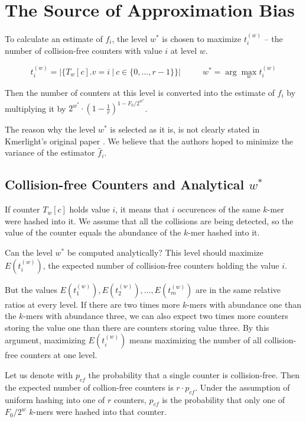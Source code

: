 \section{The Source of Approximation Bias}
\label{sec:source-of-bias}

To calculate an estimate of $f_i$, the level $w^*$ is chosen
to maximize $t_i^{(w)}$ -- the number of collision-free counters with value $i$ at level $w$.

$$t_i^{(w)} = |\{T_w[c].v = i ~|~ c \in \{0, \dots, r-1\}\}| ~~~~~~~~~~~~ w^* = \arg\max_w t_i^{(w)}$$

Then the number of counters at this level is converted into the estimate of $f_i$ by multiplying it by 
$2^{w^*} \cdot \left(1 - \frac{1}{r}\right)^{1 - F_0/2^{w^*}}$. 

The reason why the level $w^*$ is selected as it is, is not clearly stated in Kmerlight's original paper \cite{Sivadasan2016}. 
We believe that the authors hoped to minimize the variance of the estimator $\hat f_i$.

\subsection{Collision-free Counters and Analytical $w^*$}
\label{sec:analytical-w}
If counter $T_w[c]$ holds value $i$, it means that $i$ occurences of the same $k$-mer were hashed into it.
We assume that all the collisions are being detected, so the value of the counter equals the abundance of the $k$-mer hashed into it.

Can the level $w^*$ be computed analytically? This level should maximize $E(t_i^{(w)})$, the expected number of collision-free counters holding the value $i$.

But the values $E(t_1^{(w)}), E(t_2^{(w)}), \dots, E(t_m^{(w)})$ are in the same relative ratios at every level. If there are two times more $k$-mers with
abundance one than the $k$-mers with abundance three, we can also expect two times more counters storing the value one than there are counters storing value three.
By this argument, maximizing $E(t_i^{(w)})$ means maximizing the number of all collision-free counters at one level.

Let us denote with $p_{cf}$ the probability that a single counter is collision-free. Then the expected number of collion-free counters is $r \cdot p_{cf}$.
Under the assumption of uniform hashing into one of $r$ counters, $p_{cf}$ is the probability that only one of $F_0/2^w$ $k$-mers were hashed into that counter.

